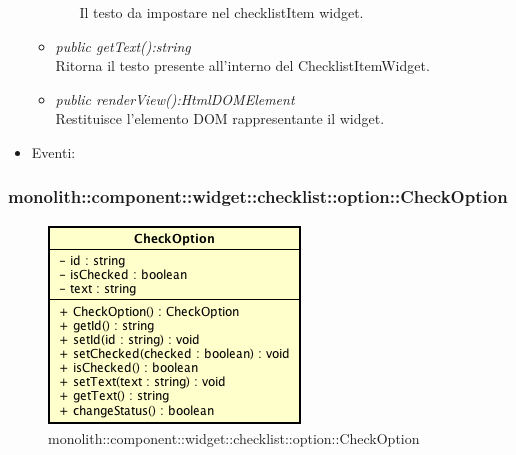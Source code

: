 \begin{itemize}
\begin{itemize}
\begin{itemize}
		Il testo da impostare nel checklistItem widget.
		\end{itemize}
	\item \textit{public getText():string}\\
	Ritorna il testo presente all'interno del ChecklistItemWidget.
	\item \textit{public renderView():HtmlDOMElement}\\
	Restituisce l'elemento DOM rappresentante il widget.
	\end{itemize}
\item{Eventi}:
\end{itemize}

\subsubsection{monolith::component::widget::checklist::option::CheckOption}

\label{monolith::component::widget::checklist::option::CheckOption}
\begin{figure}[H]
	\centering
	\includegraphics[scale=0.5]{Sezioni/SottosezioniST/img/CheckOption.png}
	\caption{monolith::component::widget::checklist::option::CheckOption}
\end{figure}

